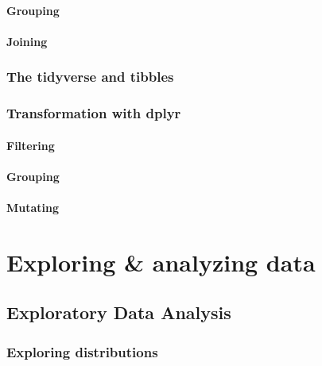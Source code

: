 \documentclass[
]{book}
\begin{document}
\hypertarget{grouping}{%
\subsection{Grouping}\label{grouping}}

\hypertarget{joining}{%
\subsection{Joining}\label{joining}}

\hypertarget{the-tidyverse-and-tibbles}{%
\section{The tidyverse and tibbles}\label{the-tidyverse-and-tibbles}}

\hypertarget{transformation-with-dplyr}{%
\section{Transformation with dplyr}\label{transformation-with-dplyr}}

\hypertarget{filtering-1}{%
\subsection{Filtering}\label{filtering-1}}

\hypertarget{grouping-1}{%
\subsection{Grouping}\label{grouping-1}}

\hypertarget{mutating}{%
\subsection{Mutating}\label{mutating}}

\hypertarget{part-exploring-analyzing-data}{%
\part{Exploring \& analyzing data}\label{part-exploring-analyzing-data}}

\hypertarget{exploratory-data-analysis}{%
\chapter{Exploratory Data Analysis}\label{exploratory-data-analysis}}

\hypertarget{exploring-distributions}{%
\section{Exploring distributions}\label{exploring-distributions}}
\end{document}
